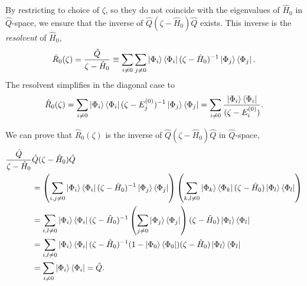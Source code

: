 By restricting to choice of $\zeta$, so they do not coincide with the eigenvalues
of $\hat{H}_0$ in $\hat{Q}$-space, we ensure that the inverse of 
$\hat{Q}(\zeta - \hat{H}_0)\hat{Q}$ exists. This inverse is the \emph{resolvent} of
$\hat{H}_0$,
\begin{equation}
    \hat{R}_0(\zeta) = \frac{\hat{Q}}{\zeta - \hat{H}_0}
        \equiv \sum_{i \neq 0} \sum_{j \neq 0}
            \ket{\Phi_i}\bra{\Phi_i} 
            (\zeta - \hat{H}_0)^{-1}
            \ket{\Phi_j}\bra{\Phi_j}.
\end{equation}
The resolvent simplifies in the diagonal case to
\begin{equation}
    \hat{R}_0(\zeta)
        = \sum_{i \neq 0} \ket{\Phi_i} \bra{\Phi_i}
            (\zeta - E_j^{(0)})^{-1} \ket{\Phi_j}\bra{\Phi_j}
        = \sum_{i \neq 0} \frac{\ket{\Phi_i} \bra{\Phi_i}}{(\zeta - E_i^{(0)})}. 
\end{equation}

We can prove that $\hat{R}_0(\zeta)$ is the inverse of
$\hat{Q}(\zeta - \hat{H}_0)\hat{Q}$ in $\hat{Q}$-space,
\begin{equation}
    \begin{aligned}
        \frac{\hat{Q}}{\zeta - \hat{H}_0} &\hat{Q}(\zeta - \hat{H}_0)\hat{Q} \\
            &= \left(
                \sum_{i,j \neq 0} \ket{\Phi_i}\bra{\Phi_i}
                    (\zeta - \hat{H}_0)^{-1} \ket{\Phi_j}\bra{\Phi_j}
            \right) \left(
                \sum_{k,l \neq 0} \ket{\Phi_k}\bra{\Phi_k}
                    (\zeta - \hat{H}_0) \ket{\Phi_l}\bra{\Phi_l}
            \right) \\
            &= \sum_{i,l \neq 0} \ket{\Phi_i}
                \bra{\Phi_i}
                    (\zeta - \hat{H}_0)^{-1}
                    \left(\sum_{j \neq 0} \ket{\Phi_j} \bra{\Phi_j} \right)
                    (\zeta - \hat{H}_0)
                \ket{\Phi_l}
            \bra{\Phi_l} \\
            &= \sum_{i, l \neq 0} \ket{\Phi_i}
                \bra{\Phi_i} (\zeta - \hat{H}_0)^{-1}
                (1 - \ket{\Phi_0}\bra{\Phi_0})
                (\zeta - \hat{H}_0) \ket{\Phi_l}
            \bra{\Phi_l} \\
            &= \sum_{i \neq 0} \ket{\Phi_i}\bra{\Phi_i} = \hat{Q}.
    \end{aligned}
\end{equation}

